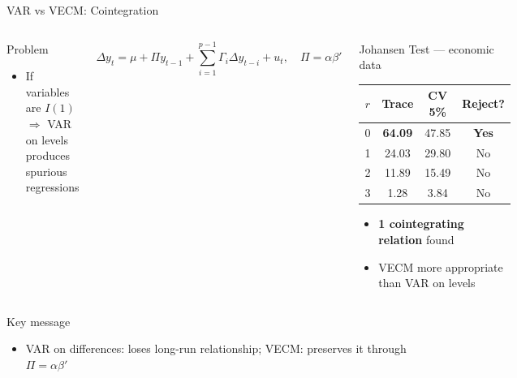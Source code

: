\documentclass[9pt, aspectratio=169, t]{beamer}
\begin{document}
\begin{frame}{VAR vs VECM: Cointegration}
    \vspace{-0.2cm}
    \begin{columns}[T]
        \begin{block}{Problem}
            \begin{itemize}\setlength{\itemsep}{0pt}
                \item If variables are $I(1)$ $\Rightarrow$ VAR on levels produces spurious regressions
            \end{itemize}
        \end{block}
        \vspace{-0.15cm}
        \begin{defn}[VECM]
            \vspace{-0.3cm}
            \[
            \Delta y_t = \mu + \Pi y_{t-1} + \sum_{i=1}^{p-1} \Gamma_i \Delta y_{t-i} + u_t, \quad \Pi = \alpha \beta'
            \]
        \end{defn}

        \begin{exampleblock}{Johansen Test --- economic data}
            {\footnotesize
            \begin{tabular}{cccc}
                $r$ & Trace & CV 5\% & Reject? \\
                \midrule
                0 & \textbf{64.09} & 47.85 & \textbf{Yes} \\
                1 & 24.03 & 29.80 & No \\
                2 & 11.89 & 15.49 & No \\
                3 & 1.28 & 3.84 & No \\
            \end{tabular}
            }
            \vspace{0.1cm}
            \begin{itemize}\setlength{\itemsep}{0pt}
                \item \textbf{1 cointegrating relation} found
                \item VECM more appropriate than VAR on levels
            \end{itemize}
        \end{exampleblock}
    \end{columns}

    \vspace{0.1cm}

    \begin{alertblock}{Key message}
        \begin{itemize}\setlength{\itemsep}{0pt}
            \item VAR on differences: loses long-run relationship; VECM: preserves it through $\Pi = \alpha \beta'$
        \end{itemize}
    \end{alertblock}
\end{frame}
\end{document}
